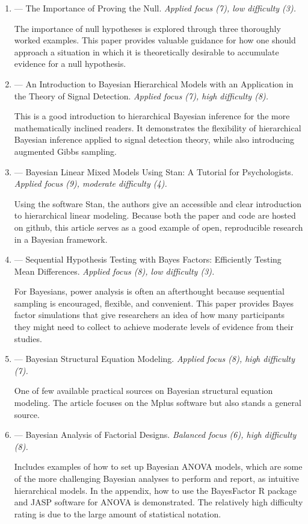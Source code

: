 \begin{enumerate}
\item
\textbf{} --- The Importance of Proving the Null. \emph{Applied focus (7), low difficulty (3).}

The importance of null hypotheses is explored through three thoroughly worked examples. This paper provides valuable guidance for how one should approach a situation in which it is theoretically desirable to accumulate evidence for a null hypothesis.

\item \textbf{} --- An Introduction to Bayesian Hierarchical Models with an Application in the Theory of Signal Detection. \emph{Applied focus (7), high difficulty (8).}

This is a good introduction to hierarchical Bayesian inference for the more mathematically inclined readers. It demonstrates the flexibility of hierarchical Bayesian inference applied to signal detection theory, while also introducing augmented Gibbs sampling.

\item \textbf{} --- Bayesian Linear Mixed Models Using Stan: A Tutorial for Psychologists. \emph{Applied focus (9), moderate difficulty (4).}

Using the software Stan, the authors give an accessible and clear introduction to hierarchical linear modeling. Because both the paper and code are hosted on github, this article serves as a good example of open, reproducible research in a Bayesian framework.

\item \textbf{} --- Sequential Hypothesis Testing with Bayes Factors: Efficiently Testing Mean Differences. \emph{Applied focus (8), low difficulty (3).}

For Bayesians, power analysis is often an afterthought because sequential sampling is encouraged, flexible, and convenient. This paper provides Bayes factor simulations that give researchers an idea of how many participants they might need to collect to achieve moderate levels of evidence from their studies. 

\item \textbf{} --- Bayesian Structural Equation Modeling. \emph{Applied focus (8), high difficulty (7).}

One of few available practical sources on Bayesian structural equation modeling. The article focuses on the Mplus software but also stands a general source.

\item \textbf{} --- Bayesian Analysis of Factorial Designs. \emph{Balanced focus (6), high difficulty (8).}

Includes examples of how to set up Bayesian ANOVA models, which are some of the more challenging Bayesian analyses to perform and report, as intuitive hierarchical models. In the appendix, how to use the BayesFactor R package and JASP software for ANOVA is demonstrated. The relatively high difficulty rating is due to the large amount of statistical notation.

\end{enumerate}

